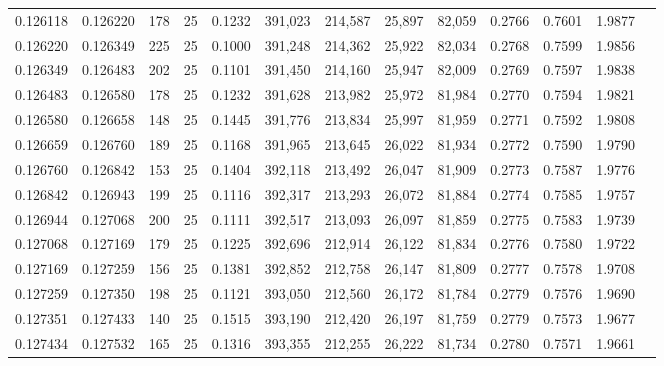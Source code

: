 \begin{tabular}{rrrrrrrrrrrrr}
0.126118 & 0.126220 &   178 &  25 &                                     0.1232 & 391,023 & 214,587 &  25,897 &  82,059 & 0.2766 & 0.7601 & 1.9877 \\
0.126220 & 0.126349 &   225 &  25 &                                     0.1000 & 391,248 & 214,362 &  25,922 &  82,034 & 0.2768 & 0.7599 & 1.9856 \\
0.126349 & 0.126483 &   202 &  25 &                                     0.1101 & 391,450 & 214,160 &  25,947 &  82,009 & 0.2769 & 0.7597 & 1.9838 \\
0.126483 & 0.126580 &   178 &  25 &                                     0.1232 & 391,628 & 213,982 &  25,972 &  81,984 & 0.2770 & 0.7594 & 1.9821 \\
0.126580 & 0.126658 &   148 &  25 &                                     0.1445 & 391,776 & 213,834 &  25,997 &  81,959 & 0.2771 & 0.7592 & 1.9808 \\
0.126659 & 0.126760 &   189 &  25 &                                     0.1168 & 391,965 & 213,645 &  26,022 &  81,934 & 0.2772 & 0.7590 & 1.9790 \\
0.126760 & 0.126842 &   153 &  25 &                                     0.1404 & 392,118 & 213,492 &  26,047 &  81,909 & 0.2773 & 0.7587 & 1.9776 \\
0.126842 & 0.126943 &   199 &  25 &                                     0.1116 & 392,317 & 213,293 &  26,072 &  81,884 & 0.2774 & 0.7585 & 1.9757 \\
0.126944 & 0.127068 &   200 &  25 &                                     0.1111 & 392,517 & 213,093 &  26,097 &  81,859 & 0.2775 & 0.7583 & 1.9739 \\
0.127068 & 0.127169 &   179 &  25 &                                     0.1225 & 392,696 & 212,914 &  26,122 &  81,834 & 0.2776 & 0.7580 & 1.9722 \\
0.127169 & 0.127259 &   156 &  25 &                                     0.1381 & 392,852 & 212,758 &  26,147 &  81,809 & 0.2777 & 0.7578 & 1.9708 \\
0.127259 & 0.127350 &   198 &  25 &                                     0.1121 & 393,050 & 212,560 &  26,172 &  81,784 & 0.2779 & 0.7576 & 1.9690 \\
0.127351 & 0.127433 &   140 &  25 &                                     0.1515 & 393,190 & 212,420 &  26,197 &  81,759 & 0.2779 & 0.7573 & 1.9677 \\
0.127434 & 0.127532 &   165 &  25 &                                     0.1316 & 393,355 & 212,255 &  26,222 &  81,734 & 0.2780 & 0.7571 & 1.9661 \\

\end{tabular}
